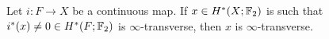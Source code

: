 Let $i:F\to X$ be a continuous map. If $x\in H^*(X;\mathbb{F}_2)$ is such that $i^*(x)\not=0\in H^*(F;\mathbb{F}_2)$ is $\infty$-transverse, then $x$ is $\infty$-transverse.
\endinput
